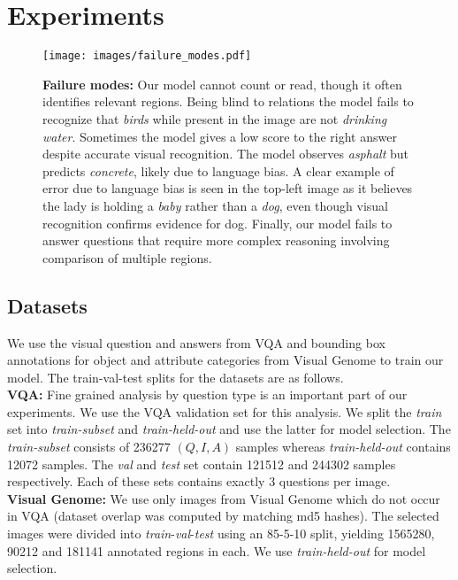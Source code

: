 \documentclass[10pt,twocolumn,letterpaper]{article}
\begin{document}
\section{Experiments}

\begin{figure*}
\begin{center}
\texttt{[image: images/failure\_modes.pdf]}
\vspace{-1.4cm}
\end{center}
  \caption{\textbf{Failure modes:} Our model cannot count or read, though it often identifies relevant regions. Being blind to relations the model fails to recognize that \textit{birds} while present in the image are not \textit{drinking water}. Sometimes the model gives a low score to the right answer despite accurate visual recognition. The model observes \textit{asphalt} but predicts \textit{concrete}, likely due to language bias. A clear example of error due to language bias is seen in the top-left image as it believes the lady is holding a \textit{baby} rather than a \textit{dog}, even though visual recognition confirms evidence for dog. Finally, our model fails to answer questions that require more complex reasoning involving comparison of multiple regions.}
\label{fig:fail_modes}
\end{figure*}

\subsection{Datasets}
We use the visual question and answers from VQA and bounding box annotations for object and attribute categories from Visual Genome to train our model. The train-val-test splits for the datasets are as follows. \\

\noindent
\textbf{VQA:} Fine grained analysis by question type is an important part of our experiments. We use the VQA validation set for this analysis. We split the \textit{train} set into \textit{train-subset} and \textit{train-held-out} and use the latter for model selection. The \textit{train-subset} consists of 236277 $(Q,I,A)$ samples whereas \textit{train-held-out} contains 12072 samples. The \textit{val} and \textit{test} set contain 121512 and 244302 samples respectively. Each of these sets contains exactly 3 questions per image. \\

\noindent
\textbf{Visual Genome:} We use only images from Visual Genome which do not occur in VQA (dataset overlap was computed by matching md5 hashes). The selected images were divided into \textit{train}-\textit{val}-\textit{test} using an 85-5-10 split, yielding 1565280, 90212 and 181141 annotated regions in each. We use \textit{train-held-out} for model selection.
\end{document}
